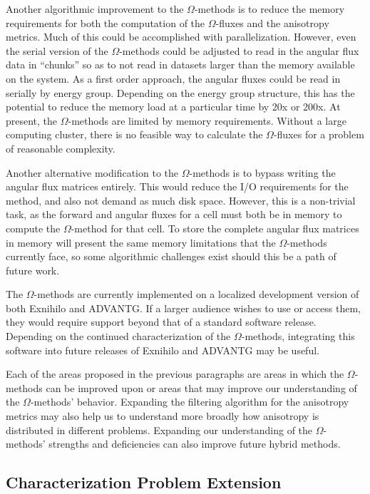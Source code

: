 Another algorithmic improvement to the $\Omega$-methods is to reduce the
memory requirements for both the computation of the $\Omega$-fluxes and the
anisotropy metrics. Much of this could be accomplished with parallelization.
However, even the serial version of the $\Omega$-methods could be adjusted to
read in the angular flux data in ``chunks'' so as to not read in datasets larger
than the memory available on the system. As a first order approach, the angular
fluxes could be read
in serially by energy group. Depending on the energy group structure, this has
the potential to
reduce the memory load at a particular time by 20x or 200x. At present, the
$\Omega$-methods are limited by memory requirements. Without a large computing
cluster, there is no feasible way to calculate the $\Omega$-fluxes for a problem
of reasonable complexity.

Another alternative modification to the $\Omega$-methods is to bypass writing
the angular flux matrices entirely. This would reduce the I/O requirements for
the method, and also not demand as much disk space. However, this is a
non-trivial task, as the forward and angular fluxes for a cell must both be in
memory to compute the $\Omega$-method for that cell. To store the complete angular
flux matrices in memory will present the same memory limitations that the $\Omega$-methods
currently face, so some algorithmic challenges exist should this be a path of
future work.

The $\Omega$-methods are currently implemented on a localized
development version of both Exnihilo and ADVANTG. If a larger audience wishes to
use or access them, they would require support beyond that of a standard
software release. Depending on the continued characterization of the
$\Omega$-methods, integrating this software into future releases of Exnihilo and
ADVANTG may be useful.

Each of the areas proposed in the previous paragraphs are areas in which the
$\Omega$-methods can be improved upon or areas that may improve our understanding of
the $\Omega$-methods' behavior. Expanding the filtering algorithm
for the anisotropy metrics may
also help us to understand more broadly how anisotropy is distributed in
different problems. Expanding our understanding of the $\Omega$-methods'
strengths and deficiencies can also improve future hybrid methods.

\subsection{Characterization Problem Extension}
\label{subsec:extendcharprobs}

